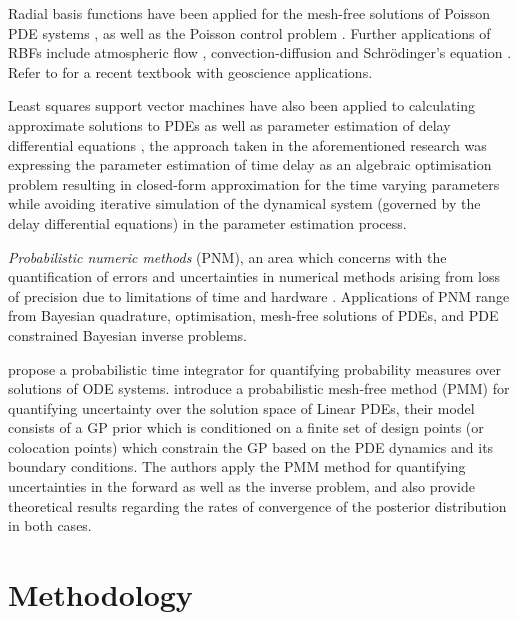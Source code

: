 Radial basis functions have been applied for the mesh-free solutions of Poisson PDE systems 
\citep{AMINATAEI20082887,DUAN200866,DUAN2006394,CNM:CNM419}, as well as the Poisson control problem 
\citep{Pearson2013}. Further applications of RBFs include atmospheric flow 
\citep{Tillenius2015406}, convection-diffusion \citep{Safdari-Vaighani2015} and Schr\"{o}dinger's 
equation \citep{doi:10.1137/120893975}. Refer to \citet{fornberg2015} for a recent textbook with 
geoscience applications.

Least squares support vector machines have also been applied to calculating approximate solutions 
to PDEs \citep{MEHRKANOON2015105,MEHRKANOON20122502} as well as parameter estimation of delay 
differential equations \citep{MEHRKANOON2014830}, the approach taken in the aforementioned research 
\citep{MEHRKANOON2014830} was expressing the parameter estimation of time delay as an algebraic 
optimisation problem resulting in closed-form approximation for the time varying parameters while 
avoiding iterative simulation of the dynamical system 
(governed by the delay differential equations) in the parameter estimation process.

\emph{Probabilistic numeric methods} (PNM), an area which concerns with the quantification of 
errors and uncertainties in numerical methods arising from loss of precision due to limitations of 
time and hardware \citep{hennig2015probabilistic}. Applications of PNM range from Bayesian 
quadrature, optimisation, mesh-free solutions of PDEs, and PDE constrained Bayesian inverse 
problems. 

\citet{conrad2017statistical} propose a probabilistic time integrator for quantifying probability 
measures over solutions of ODE systems. \citet{girolamiSullivanPDE} introduce a probabilistic 
mesh-free method (PMM) for quantifying uncertainty over the solution space of Linear PDEs, their 
model consists of a GP prior which is conditioned on a finite set of design points 
(or colocation points) which constrain the GP based on the PDE dynamics and its boundary 
conditions. The authors apply the PMM method for quantifying uncertainties in the forward as well 
as the inverse problem, and also provide theoretical results regarding the rates of convergence 
of the posterior distribution in both cases.

\section{Methodology}

